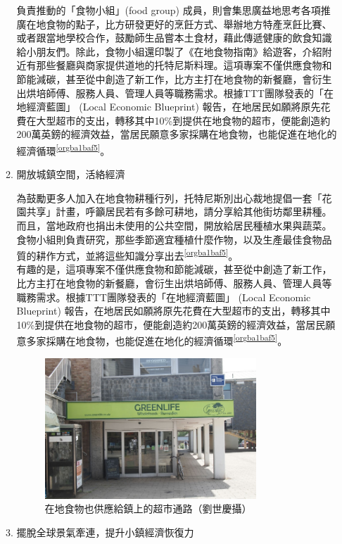 \documentclass[a4paper,12pt]{article}
\begin{document}
\begin{enumerate}
\begin{enumerate}
負責推動的「食物小組」(food group) 成員，則會集思廣益地思考各項推廣在地食物的點子，比方研發更好的烹飪方式、舉辦地方特產烹飪比賽、或者跟當地學校合作，鼓勵師生品嘗本土食材，藉此傳遞健康的飲食知識給小朋友們。除此，食物小組還印製了《在地食物指南》給遊客，介紹附近有那些餐廳與商家提供道地的托特尼斯料理。這項專案不僅供應食物和節能減碳，甚至從中創造了新工作，比方主打在地食物的新餐廳，會衍生出烘培師傅、服務人員、管理人員等職務需求。根據TTT團隊發表的「在地經濟藍圖」 (Local Economic Blueprint) 報告，在地居民如願將原先花費在大型超市的支出，轉移其中10\%到提供在地食物的超市，便能創造約200萬英鎊的經濟效益，當居民願意多家採購在地食物，也能促進在地化的經濟循環\textsuperscript{\ref{orgba1baf5}}。\\
\item 開放城鎮空間，活絡經濟
\label{sec:orgd51e203}

為鼓勵更多人加入在地食物耕種行列，托特尼斯別出心裁地提倡一套「花園共享」計畫，呼籲居民若有多餘可耕地，請分享給其他街坊鄰里耕種。而且，當地政府也捐出未使用的公共空間，開放給居民種植水果與蔬菜。食物小組則負責研究，那些季節適宜種植什麼作物，以及生產最佳食物品質的耕作方式，並將這些知識分享出去\textsuperscript{\ref{orgba1baf5}}。\\

有趣的是，這項專案不僅供應食物和節能減碳，甚至從中創造了新工作，比方主打在地食物的新餐廳，會衍生出烘培師傅、服務人員、管理人員等職務需求。根據TTT團隊發表的「在地經濟藍圖」 (Local Economic Blueprint) 報告，在地居民如願將原先花費在大型超市的支出，轉移其中10\%到提供在地食物的超市，便能創造約200萬英鎊的經濟效益，當居民願意多家採購在地食物，也能促進在地化的經濟循環\textsuperscript{\ref{orgba1baf5}}。\\
\begin{figure}[htbp]
\centering
\includegraphics[width=300]{images/ttt.jpg}
\caption{\label{fig:ttt}在地食物也供應給鎮上的超市通路（劉世慶攝）}
\end{figure}
\item 擺脫全球景氣牽連，提升小鎮經濟恢復力
\label{sec:org70836ad}


\end{enumerate}
\end{enumerate}
\end{document}

